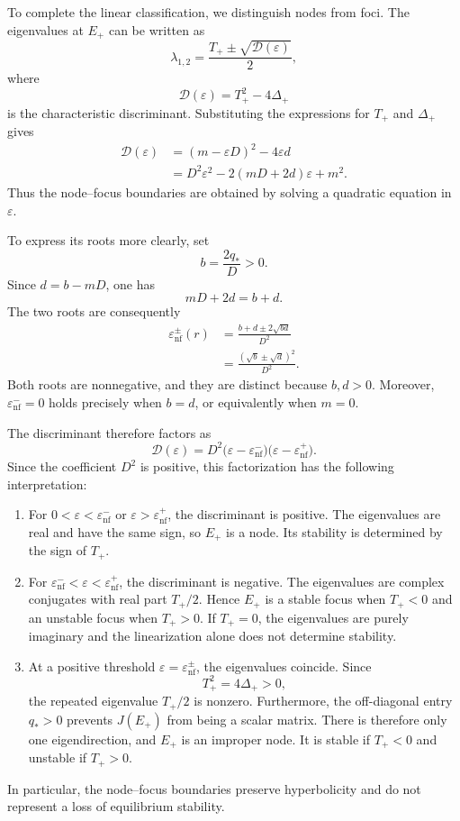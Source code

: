 \documentclass[11pt,reqno]{amsart}
\theoremstyle{plain}
\theoremstyle{definition}
\theoremstyle{remark}
\begin{document}
To complete the linear classification, we distinguish nodes
from foci. The eigenvalues at $E_+$ can be written as
\[
\lambda_{1,2}
=
\frac{
T_+\pm\sqrt{\mathcal D(\varepsilon)}
}{2},
\]
where
\[
\mathcal D(\varepsilon)
=
T_+^2-4\Delta_+
\]
is the characteristic discriminant. Substituting the
expressions for $T_+$ and $\Delta_+$ gives
\[
\begin{aligned}
\mathcal D(\varepsilon)
&=
(m-\varepsilon D)^2-4\varepsilon d
\\
&=
D^2\varepsilon^2
-
2(mD+2d)\varepsilon
+
m^2.
\end{aligned}
\]
Thus the node--focus boundaries are obtained by solving a
quadratic equation in $\varepsilon$.

To express its roots more clearly, set
\[
b=\frac{2q_*}{D}>0.
\]
Since $d=b-mD$, one has
\[
mD+2d=b+d.
\]
The two roots are consequently
\begin{equation}
\begin{aligned}
\varepsilon_{\mathrm{nf}}^\pm(r)
&=
\frac{
b+d\pm2\sqrt{bd}
}{D^2}
\\
&=
\frac{
(\sqrt b\pm\sqrt d)^2
}{D^2}.
\end{aligned}
\label{eq:bl-nf-thresholds}
\end{equation}
Both roots are nonnegative, and they are distinct because
$b,d>0$. Moreover,
$\varepsilon_{\mathrm{nf}}^-=0$ holds precisely when
$b=d$, or equivalently when $m=0$.

The discriminant therefore factors as
\begin{equation}
\mathcal D(\varepsilon)
=
D^2
\bigl(
\varepsilon-\varepsilon_{\mathrm{nf}}^-
\bigr)
\bigl(
\varepsilon-\varepsilon_{\mathrm{nf}}^+
\bigr).
\label{eq:bl-characteristic-discriminant}
\end{equation}
Since the coefficient $D^2$ is positive, this factorization
has the following interpretation:
\begin{enumerate}
\item
For $0<\varepsilon<\varepsilon_{\mathrm{nf}}^-$ or
$\varepsilon>\varepsilon_{\mathrm{nf}}^+$, the discriminant
is positive. The eigenvalues are real and have the same
sign, so $E_+$ is a node. Its stability is determined by
the sign of $T_+$.

\item
For
$\varepsilon_{\mathrm{nf}}^-<\varepsilon
<\varepsilon_{\mathrm{nf}}^+$, the discriminant is negative.
The eigenvalues are complex conjugates with real part
$T_+/2$. Hence $E_+$ is a stable focus when $T_+<0$
and an unstable focus when $T_+>0$. If $T_+=0$, the
eigenvalues are purely imaginary and the linearization
alone does not determine stability.

\item
At a positive threshold
$\varepsilon=\varepsilon_{\mathrm{nf}}^\pm$, the
eigenvalues coincide. Since
\[
T_+^2=4\Delta_+>0,
\]
the repeated eigenvalue $T_+/2$ is nonzero.
Furthermore, the off-diagonal entry $q_*>0$ prevents
$J(E_+)$ from being a scalar matrix. There is therefore
only one eigendirection, and $E_+$ is an improper node.
It is stable if $T_+<0$ and unstable if $T_+>0$.
\end{enumerate}
In particular, the node--focus boundaries preserve
hyperbolicity and do not represent a loss of equilibrium
stability.
\end{document}
